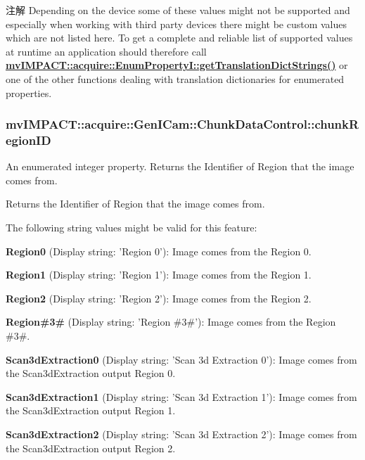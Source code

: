 \begin{DoxyNote}{注解}
Depending on the device some of these values might not be supported and especially when working with third party devices there might be custom values which are not listed here. To get a complete and reliable list of supported values at runtime an application should therefore call {\bfseries \hyperlink{classmv_i_m_p_a_c_t_1_1acquire_1_1_enum_property_i_a0ba6ccbf5ee69784d5d0b537924d26b6}{mv\+I\+M\+P\+A\+C\+T\+::acquire\+::\+Enum\+Property\+I\+::get\+Translation\+Dict\+Strings()}} or one of the other functions dealing with translation dictionaries for enumerated properties. 
\end{DoxyNote}
\hypertarget{classmv_i_m_p_a_c_t_1_1acquire_1_1_gen_i_cam_1_1_chunk_data_control_aca35041bfcc573ab5d91adb8e386bfcb}{
\subsubsection[{chunk\+Region\+I\+D}]{ mv\+I\+M\+P\+A\+C\+T\+::acquire\+::\+Gen\+I\+Cam\+::\+Chunk\+Data\+Control\+::chunk\+Region\+I\+D}}\label{classmv_i_m_p_a_c_t_1_1acquire_1_1_gen_i_cam_1_1_chunk_data_control_aca35041bfcc573ab5d91adb8e386bfcb}


An enumerated integer property. Returns the Identifier of Region that the image comes from. 

Returns the Identifier of Region that the image comes from.

The following string values might be valid for this feature\+:
\begin{DoxyItemize}
\item {\bfseries Region0} (Display string\+: 'Region 0')\+: Image comes from the Region 0.
\item {\bfseries Region1} (Display string\+: 'Region 1')\+: Image comes from the Region 1.
\item {\bfseries Region2} (Display string\+: 'Region 2')\+: Image comes from the Region 2.
\item {\bfseries Region\#3\#} (Display string\+: 'Region \#3\#')\+: Image comes from the Region \#3\#.
\item {\bfseries Scan3d\+Extraction0} (Display string\+: 'Scan 3d Extraction 0')\+: Image comes from the Scan3d\+Extraction output Region 0.
\item {\bfseries Scan3d\+Extraction1} (Display string\+: 'Scan 3d Extraction 1')\+: Image comes from the Scan3d\+Extraction output Region 1.
\item {\bfseries Scan3d\+Extraction2} (Display string\+: 'Scan 3d Extraction 2')\+: Image comes from the Scan3d\+Extraction output Region 2.
\end{DoxyItemize}

